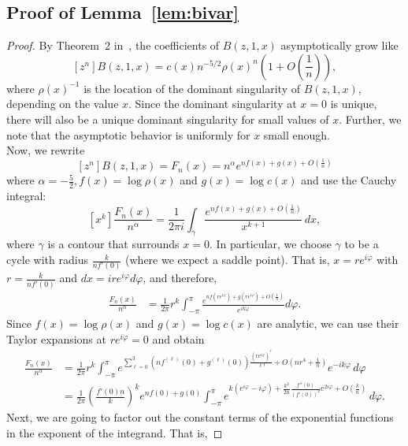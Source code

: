 \documentclass[reqno, 11pt]{amsart}
\theoremstyle{definition}
\theoremstyle{remark}
\numberwithin{equation}{section}
\begin{document}
\subsection{Proof of Lemma~\ref{lem:bivar}} 
\begin{proof}
    By Theorem~2 in~\cite{DrmotaNoyYu}, the coefficients of $B(z,1,x)$ asymptotically grow like
    \[
        [z^n]B(z,1,x) = c(x)n^{-5/2}\rho(x)^n\left(1+O\left(\frac{1}{n}\right)\right),
    \]
    where $\rho(x)^{-1}$ is the location of the dominant singularity of $B(z,1,x)$, depending on the value $x$. Since the dominant singularity at $x=0$ is unique, there will also be a unique dominant singularity for small  values of $x$. Further, we note that the asymptotic behavior is uniformly for $x$ small enough.\\ Now, we rewrite
    \[
        [z^n]B(z,1,x) = F_n(x) =  n^{\alpha}e^{nf(x)+g(x)+O(\frac{1}{n})}
    \]
    where $\alpha = -\frac{5}{2}, f(x) = \log \rho(x)$ and $g(x) = \log c(x)$ and use the Cauchy integral:
    \[
        [x^k]\frac{F_n(x)}{n^{\alpha}} = \frac{1}{2\pi i} \int_\gamma \frac {e^{nf(x) + g(x)+O(\frac{1}{n})}}{x^{k+1}}\, dx,
    \]
    where $\gamma$ is a contour that surrounds $x=0$. 
    In particular, we choose $\gamma$ to be a cycle with
    radius $\frac{k}{nf'(0)}$ (where we expect a saddle point). That is, $x = r e^{i\varphi}$ with $r = \frac{k}{nf'(0)}$ and $dx = ire^{i\varphi}d\varphi$, and therefore,
    \begin{align*}
        [x^k]\frac{F_n(x)}{n^{\alpha}} &= 
        \frac{1}{2\pi}r^{k}\int_{-\pi}^{\pi} \frac{e^{nf(re^{i\varphi})+g(re^{i\varphi})+O(\frac{1}{n})}}{e^{ik\varphi}}d\varphi.
    \end{align*}
    Since $f(x) = \log \rho(x)$ and $g(x) = \log c(x)$ are analytic, we can use their Taylor expansions at $re^{i\varphi} = 0$ and obtain
    \begin{align*}
        [x^k]\frac{F_n(x)}{n^{\alpha}} &= \frac{1}{2\pi}r^{k} \int_{-\pi}^\pi e^{\sum_{\ell=0}^3 \left(nf^{(\ell)}(0)+g^{(\ell)}(0)\right)\frac{(r e^{i\varphi})^\ell
        }{\ell!}+O(nr^4+\frac{1}{n})} e^{-ik\varphi}\, d\varphi \\
        & = \frac{1}{2\pi}   \left(\frac{f'(0)n}{ k}\right)^{k}
        e^{nf(0)+g(0)}
        \int_{-\pi}^\pi  e^{k(e^{i\varphi} - i\varphi) + \frac{k^2}{2n} \frac{f''(0)}{(f'(0))^2}  e^{2i\varphi} 
         + O\left(\frac{k}{n}\right)} \, d\varphi.
    \end{align*}
    Next, we are going to factor out the constant terms of the exponential functions in the exponent of the integrand. That is,

\end{proof}
\end{document}

